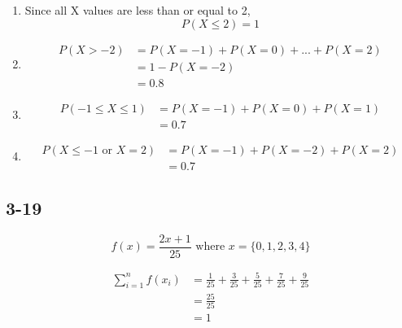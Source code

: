 \documentclass{article}
\begin{document}
\begin{enumerate}[label=(\alph*)]
    \item
        Since all X values are less than or equal to 2,
        \begin{equation*}
            P(X \leq 2) = 1
        \end{equation*}

    \item
        \begin{equation*}
            \begin{aligned}
                P(X > -2) &= P(X = -1) + P(X = 0) + ... + P(X = 2) \\
                            &= 1 - P(X = -2) \\
                            &= 0.8
            \end{aligned}
        \end{equation*}

    \item
        \begin{equation*}
            \begin{aligned}
                P(-1 \leq X \leq 1) &= P(X = -1) + P(X = 0) + P(X = 1) \\
                                    &= 0.7
            \end{aligned}
        \end{equation*}

    \item
        \begin{equation*}
            \begin{aligned}
                P(X \leq -1 \text{ or } X = 2) &= P(X = -1) + P(X = -2) + P(X = 2) \\
                                      &= 0.7
            \end{aligned}
        \end{equation*}
\end{enumerate}

\subsection*{3-19}
\begin{equation*}
    f(x) = \frac{2x + 1}{25} \text{ where } x = \{0, 1, 2, 3, 4\}
\end{equation*}

\begin{equation*}
    \begin{aligned}
        \sum_{i = 1}^{n} f(x_i) &= \frac{1}{25} + \frac{3}{25} + \frac{5}{25}
                                    + \frac{7}{25} + \frac{9}{25} \\
                                &= \frac{25}{25} \\
                                &= 1
    \end{aligned}
\end{equation*}
\end{document}
